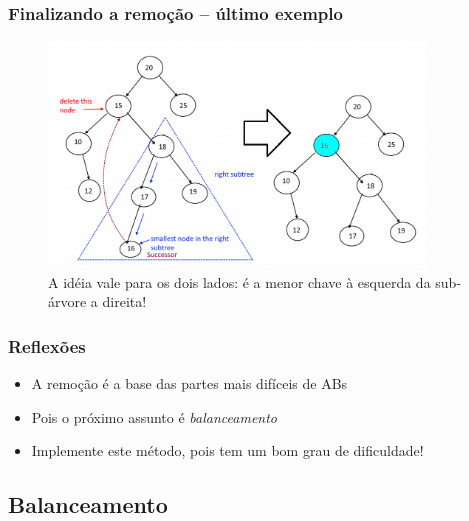 \begin{frame}
\frametitle{Finalizando a remoção -- último exemplo}

   \begin{figure}[!ht]
    \centering
    \includegraphics[keepaspectratio=true,width=10cm]{figs/fig_arvores/ex03_Delete_NODE.jpg}
 \caption{A idéia vale para os dois lados: é a menor chave à esquerda  da sub-árvore a direita!}
    \end{figure}

\end{frame}


\begin{frame}

\frametitle{Reflexões}

\begin{block}{}
\begin{itemize}
  \item A remoção é a base das partes mais difíceis de ABs
  \item Pois o próximo assunto é \textit{balanceamento}
  \item Implemente este método, pois tem um bom grau de dificuldade!
\end{itemize}
\end{block}

\end{frame}


\subsection{Balanceamento}

